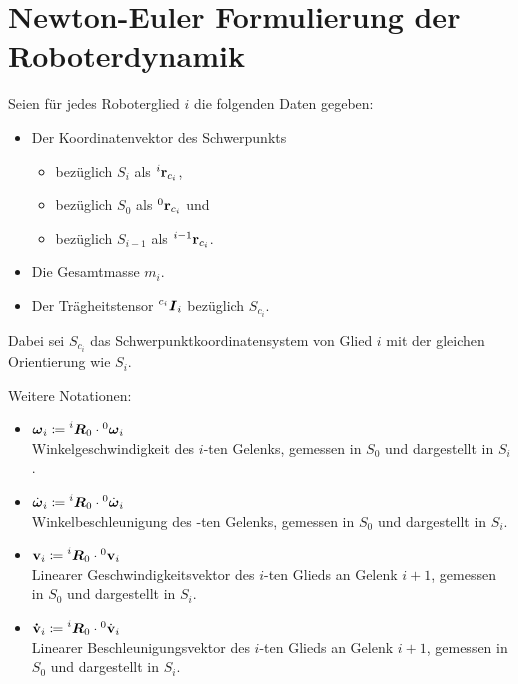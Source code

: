 \documentclass[a4paper, 11pt, accentcolor = tud3b]{tudreport}
\newcommand{\inreferenceto}[2]{\prescript{#1}{}{#2}}
\newcommand{\mat}[1]{\boldsymbol{#1}}
\renewcommand{\vec}[1]{\boldsymbol{\mathbf{#1}}}
\begin{document}
		\section{Newton-Euler Formulierung der Roboterdynamik} %
			Seien für jedes Roboterglied \(i\) die folgenden Daten gegeben:
			\begin{itemize}
				\item Der Koordinatenvektor des Schwerpunkts
					\begin{itemize}
						\item bezüglich \(S_i\) als \( \inreferenceto{i}{\vec{r}}_{c_i} \),
						\item bezüglich \(S_0\) als \( \inreferenceto{0}{\vec{r}}_{c_i} \) und
						\item bezüglich \(S_{i - 1}\) als \( \inreferenceto{i - 1}{\vec{r}}_{c_i} \).
					\end{itemize}
				\item Die Gesamtmasse \(m_i\).
				\item Der Trägheitstensor \( \inreferenceto{c_i}{\mat{I}}_i \) bezüglich \( S_{c_i} \).
			\end{itemize}
			Dabei sei \( S_{c_i} \) das Schwerpunktkoordinatensystem von Glied \(i\) mit der gleichen Orientierung wie \( S_i \).
			
			Weitere Notationen:
			\begin{itemize}
				\item \( \vec{\omega}_i \coloneqq \inreferenceto{i}{\mat{R}}_0 \cdot \inreferenceto{0}{\vec{\omega}}_i \) \\
						Winkelgeschwindigkeit des \(i\)-ten Gelenks, gemessen in \(S_0\) und dargestellt in \(S_i\).
				\item \( \dot{\vec{\omega}}_i \coloneqq \inreferenceto{i}{\mat{R}}_0 \cdot \inreferenceto{0}{\dot{\vec{\omega}}}_i \) \\
						Winkelbeschleunigung des \(\)-ten Gelenks, gemessen in \(S_0\) und dargestellt in \(S_i\).
				\item \( \vec{v}_i \coloneqq \inreferenceto{i}{\mat{R}}_0 \cdot \inreferenceto{0}{\vec{v}}_i \) \\
						Linearer Geschwindigkeitsvektor des \(i\)-ten Glieds an Gelenk \(i + 1\), gemessen in \(S_0\) und dargestellt in \(S_i\).
				\item \( \vec{\dot{v}}_i \coloneqq \inreferenceto{i}{\mat{R}}_0 \cdot \inreferenceto{0}{\dot{\vec{v}}}_i \) \\
						Linearer Beschleunigungsvektor des \(i\)-ten Glieds an Gelenk \(i + 1\), gemessen in \(S_0\) und dargestellt in \(S_i\).
			\end{itemize}
\end{document}
